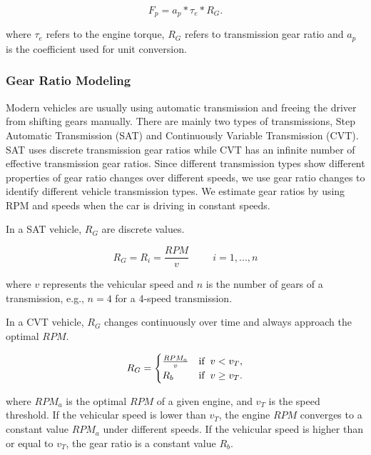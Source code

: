 \begin{equation}
 F_p = a_p * \tau_e * R_G.
\end{equation}

where $\tau_e$ refers to the engine torque, 
$R_G$ refers to transmission gear ratio
and $a_p$ is the coefficient used for unit conversion. 


\subsubsection{Gear Ratio Modeling}

Modern vehicles are usually using automatic transmission and 
freeing the driver from shifting gears manually. 
There are mainly two types of transmissions, 
Step Automatic Transmission (SAT) and Continuously Variable Transmission (CVT). 
SAT uses discrete transmission gear ratios while CVT has an
infinite number of effective transmission gear ratios. 
Since different transmission types show different
properties of gear ratio changes over different speeds, 
we use gear ratio changes to identify different
vehicle transmission types. 
We estimate gear ratios by using RPM and speeds 
when the car is driving in constant speeds. 



In a SAT vehicle, $R_G$ are discrete values.
  
\begin{equation}
   R_G = R_i = \frac{RPM}{v}  \hspace{1cm} i = 1,...,n
 \end{equation}

where $v$ represents the vehicular speed 
and $n$ is the number of gears of a transmission, 
e.g., $n=4$ for a 4-speed transmission. 

In a CVT vehicle, $R_G$ changes continuously over time and always
approach the optimal $RPM$. 

\begin{equation}
   R_G =
   \begin{cases}
   \frac{RPM_a}{v}     &  \mbox{if} \hspace{0.2cm} v < v_T, \\
   R_b   &  \mbox{if} \hspace{0.2cm} v \geq v_T.
   \end{cases}
  \end{equation}

where $RPM_a$ is the optimal $RPM$ of a given engine, 
and $v_T$ is the speed threshold. 
If the vehicular speed is lower than $v_T$, 
the engine $RPM$ converges to a constant value $RPM_a$ under
different speeds. 
If the vehicular speed is higher than or equal to $v_T$, 
the gear ratio is a constant value $R_b$. 


